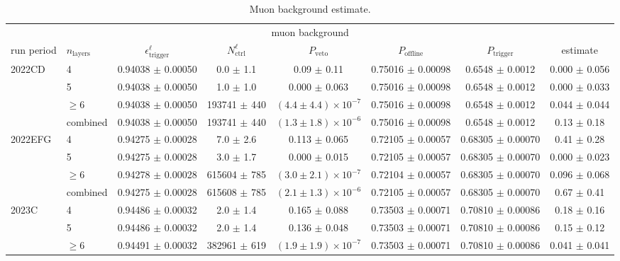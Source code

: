 \begin{table}
\centering
\caption{Muon background estimate.}
\label{tab:lepton_background_estimate}
\begin{tiny}
\begin{tabular}{llcccccc}
\hline
\multicolumn{8}{c}{muon background} \\
run period & $n_{\mathrm{layers}}$ & $\epsilon_{\mathrm{trigger}}^{\ell}$ & $N_{\mathrm{ctrl}}^{\ell}$ & $P_{\mathrm{veto}}$ & $P_{\mathrm{offline}}$ & $P_{\mathrm{trigger}}$ & estimate \\
\hline
\multirow{4}{*}{2022CD} & 4 & 0.94038 $\pm$ 0.00050 & 0.0 $\pm$ 1.1 & 0.09 $\pm$ 0.11 & 0.75016 $\pm$ 0.00098 & 0.6548 $\pm$ 0.0012 & 0.000 $\pm$ 0.056 \\
 & 5 & 0.94038 $\pm$ 0.00050 & 1.0 $\pm$ 1.0 & 0.000 $\pm$ 0.063 & 0.75016 $\pm$ 0.00098 & 0.6548 $\pm$ 0.0012 & 0.000 $\pm$ 0.033 \\
 & $\geq 6$ & 0.94038 $\pm$ 0.00050 & 193741 $\pm$ 440 & $(4.4 \pm 4.4) \times 10^{-7}$ & 0.75016 $\pm$ 0.00098 & 0.6548 $\pm$ 0.0012 & 0.044 $\pm$ 0.044 \\
 & combined & 0.94038 $\pm$ 0.00050 & 193741 $\pm$ 440 & $(1.3 \pm 1.8) \times 10^{-6}$ & 0.75016 $\pm$ 0.00098 & 0.6548 $\pm$ 0.0012 & 0.13 $\pm$ 0.18 \\
\hline
\multirow{4}{*}{2022EFG} & 4 & 0.94275 $\pm$ 0.00028 & 7.0 $\pm$ 2.6 & 0.113 $\pm$ 0.065 & 0.72105 $\pm$ 0.00057 & 0.68305 $\pm$ 0.00070 & 0.41 $\pm$ 0.28 \\
 & 5 & 0.94275 $\pm$ 0.00028 & 3.0 $\pm$ 1.7 & 0.000 $\pm$ 0.015 & 0.72105 $\pm$ 0.00057 & 0.68305 $\pm$ 0.00070 & 0.000 $\pm$ 0.023 \\
 & $\geq 6$ & 0.94278 $\pm$ 0.00028 & 615604 $\pm$ 785 & $(3.0 \pm 2.1) \times 10^{-7}$ & 0.72104 $\pm$ 0.00057 & 0.68305 $\pm$ 0.00070 & 0.096 $\pm$ 0.068 \\
 & combined & 0.94275 $\pm$ 0.00028 & 615608 $\pm$ 785 & $(2.1 \pm 1.3) \times 10^{-6}$ & 0.72105 $\pm$ 0.00057 & 0.68305 $\pm$ 0.00070 & 0.67 $\pm$ 0.41 \\
\hline
\multirow{4}{*}{2023C} & 4 & 0.94486 $\pm$ 0.00032 & 2.0 $\pm$ 1.4 & 0.165 $\pm$ 0.088 & 0.73503 $\pm$ 0.00071 & 0.70810 $\pm$ 0.00086 & 0.18 $\pm$ 0.16 \\
 & 5 & 0.94486 $\pm$ 0.00032 & 2.0 $\pm$ 1.4 & 0.136 $\pm$ 0.048 & 0.73503 $\pm$ 0.00071 & 0.70810 $\pm$ 0.00086 & 0.15 $\pm$ 0.12 \\
 & $\geq 6$ & 0.94491 $\pm$ 0.00032 & 382961 $\pm$ 619 & $(1.9 \pm 1.9) \times 10^{-7}$ & 0.73503 $\pm$ 0.00071 & 0.70810 $\pm$ 0.00086 & 0.041 $\pm$ 0.041 \\

\end{tabular}
\end{tiny}
\end{table}
